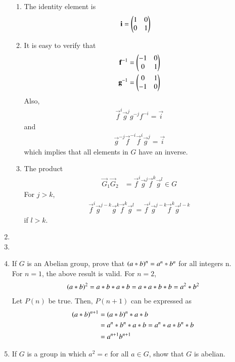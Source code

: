 \begin{enumerate}[label=\arabic*.,ref=\thesubsection.\theenumi]
\begin{enumerate}
	\item The identity element is 
\begin{align}
	\mathbf{i} &= 	\begin{pmatrix}1 & 0\\0 & 1\end{pmatrix}
\end{align}
	\item It is easy to verify that 
\begin{align}
	\mathbf{f}^{-1} &= 	\begin{pmatrix}-1 & 0\\0 & 1\end{pmatrix}
		\\
	\mathbf{g}^{-1} &= 
	\begin{pmatrix}0  & 1\\-1 & 0\end{pmatrix}
\end{align}
Also, 
\begin{align}
	\vec{f}^{i}
	\vec{g}^{j}g^{-j}f^{-i} =\vec{i} 
\end{align}
and 
\begin{align}
	\vec{g}^{-j}\vec{f}^{-i}	\vec{f}^{i}
	\vec{g}^{j} =\vec{i} 
\end{align}
which implies that all elements in $G$ have an inverse.
	\item The product
\begin{align}
	\vec{G}_1 	\vec{G}_2&= \vec{f}^i\vec{g}^j 
  \vec{f}^k\vec{g}^l \in G
\end{align}
For $j > k$,
\begin{align}
	\vec{f}^i\vec{g}^{j-k} \vec{g}^{k}
  \vec{f}^k\vec{g}^l  = 
	\vec{f}^i\vec{g}^{j-k} \vec{f}^{k}
	\vec{g}^{l-k}
\end{align}
if $l > k$.
\end{enumerate}
\item 
\item 
\item If $G$ is an Abelian group, prove that $\left(a*b\right)^n = a^n * b^n$ for all integers n.
	\\
	\solution For $n = 1$, the above result is valid.  For $n = 2$, 
\begin{align}
	\left(a*b\right)^2 = a*b*a*b = a*a*b*b = a^2*b^2
\end{align}
Let $P(n)$ be true.  Then, $P(n+1)$ can be expressed as 
\begin{align}
	\left(a*b\right)^{n+1} &= \left(a*b\right)^{n}*a*b 
	\\
	&= a^n*b^n*a*b = a^n*a*b^n*b 
	\\
	&= a^{n+1}b^{n+1}
\end{align}
\item If $G$ is a group in which $a^2 = e$ for all $a \in G$, show that $G$ is abelian.
	\\

\end{enumerate}
